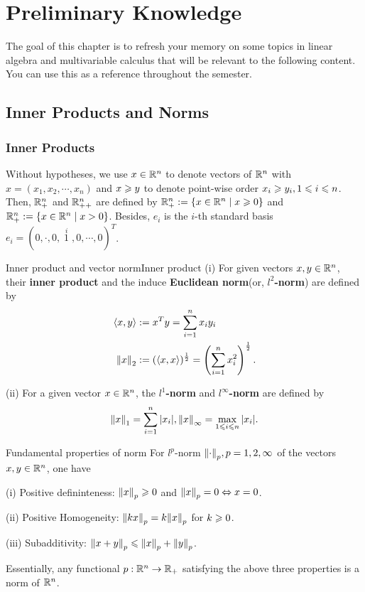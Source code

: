 \chapter{Preliminary Knowledge}

The goal of this chapter is to refresh your memory on some
topics in linear algebra and multivariable calculus that will be
relevant to the following content. You can use this as a reference
throughout the semester. 

\section{Inner Products and Norms}
\subsection{Inner Products}
Without hypotheses, we use $x\in \mathbb{R}^n$ to denote vectors of $\mathbb{R}^n$ with $x=(x_1,x_2,\cdots,x_n)$ and $x\geqslant y$ to denote point-wise order $x_i\geqslant y_i,1\leqslant i \leqslant n$. Then, $\mathbb{R}^n_+$ and $\mathbb{R}^n_{++}$ are defined by $\mathbb{R}^n_+:=\{x\in \mathbb{R}^n\mid x\geqslant 0\}$ and  $\mathbb{R}^n_+:=\{x\in \mathbb{R}^n\mid x> 0\}$. Besides, $e_i$ is the $i$-th 
standard basis $e_i=(0,\cdot,0,\mathop{1}\limits^{i},0,\cdots,0)^T$.
\begin{definition}{Inner product and vector norm}{Inner product}
    (i) For given vectors $x,y\in \mathbb{R}^n$, their \textbf{inner product} and the induce \textbf{Euclidean norm}(or, \textbf{$l^2$-norm}) are defined by
    \begin{align*}
        \langle x,y\rangle &:=x^Ty = \sum_{i=1}^nx_iy_i\\
        \norm{x}_2 &:=(\langle x,x\rangle)^{\frac{1}{2}} = \left(\sum\limits_{i=1}^nx_i^2\right)^{\frac{1}{2}}. 
    \end{align*}

    (ii) For a given vector $x\in \mathbb{R}^n$, the \textbf{$l^1$-norm} and \textbf{$l^{\infty}$-norm} are defined by
    \begin{align*}
        \norm{x}_1=\sum_{i=1}^n|x_i|,\norm{x}_{\infty}=\max_{1\leqslant i \leqslant n}|x_i|.
    \end{align*}
\end{definition}
\begin{proposition}{Fundamental properties of norm}{}
    For $l^p$-norm $\norm{\cdot}_p,p=1,2,\infty$ of the vectors $x,y\in \mathbb{R}^n$, one have

    (i) Positive defininteness: $\norm{x}_p\geqslant 0$ and $\norm{x}_p=0\Leftrightarrow x = 0$.

    (ii) Positive Homogeneity: $\norm{kx}_p = k\norm{x}_p$ for $k\geqslant 0$.

    (iii) Subadditivity: $\norm{x+y}_p\leqslant \norm{x}_p + \norm{y}_p$.
\end{proposition}
\begin{remark}
    Essentially, any functional $p:\mathbb{R}^n\to \mathbb{R}_+$ satisfying the above three properties is a norm of $\mathbb{R}^n$.
\end{remark}

